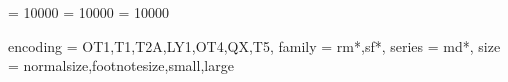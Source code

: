 
\clubpenalty = 10000
\widowpenalty = 10000
\displaywidowpenalty = 10000

    { encoding = {OT1,T1,T2A,LY1,OT4,QX,T5},
      family   = {rm*,sf*},
      series   = {md*},
      size     = {normalsize,footnotesize,small,large}
    }
%
\makeatletter
\g@addto@macro{}
\makeatother

\DeclareRobustCommand{\spacedallcaps}[1]{\textls[160]{\MakeTextUppercase{#1}}}
\DeclareRobustCommand{\spacedmidcaps}[1]{\textls[110]{\MakeTextUppercase{#1}}}
\DeclareRobustCommand{\spacedsmallcaps}[1]{\textls[80]{\MakeTextUppercase{#1}}}
\DeclareRobustCommand{\spacedlowsmallcaps}[1]{\textls[80]{\scshape\MakeTextLowercase{#1}}}


%
%
\clearscrheadings
    \setheadsepline{.2pt}
    \renewcommand{\chaptermark}[1]{\markboth{\spacedlowsmallcaps{#1}}{\spacedlowsmallcaps{#1}}}
    \renewcommand{\sectionmark}[1]{\markright{\thesection\enspace\spacedlowsmallcaps{#1}}} 
    \lehead{\mbox{\llap{\small\textbf{\thepage}\kern2em}\headmark\hfil}}
    \rohead{\mbox{\hfil{\headmark}\rlap{\small\kern2em\textbf{\thepage}}}}
    \renewcommand{\headfont}{\small}
		\def\toc@heading{%
	 		\ifthenelse{\boolean{@nochapters}}%
	 		{\section*{\contentsname}}%
	 		{\chapter*{\contentsname}}%
	 		\@mkboth{\spacedlowsmallcaps{\contentsname}}{\spacedlowsmallcaps{\contentsname}}}


